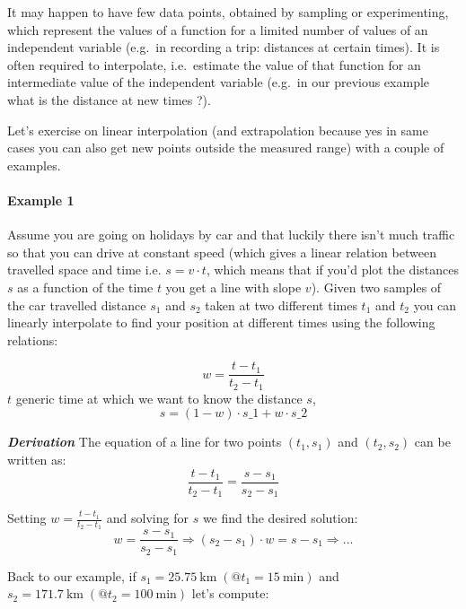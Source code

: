 \documentclass[11pt]{article}
\begin{document}
It may happen to have few data points, obtained by sampling or
experimenting, which represent the values of a function for a limited
number of values of an independent variable (e.g.~in recording a trip:
distances at certain times). It is often required to interpolate,
i.e.~estimate the value of that function for an intermediate value of
the independent variable (e.g.~in our previous example what is the
distance at new times ?).

Let's exercise on linear interpolation (and extrapolation because yes in
same cases you can also get new points outside the measured range) with
a couple of examples.

\hypertarget{example-1}{%
\paragraph{Example 1}\label{example-1}}

Assume you are going on holidays by car and that luckily there isn't
much traffic so that you can drive at constant speed (which gives a
linear relation between travelled space and time i.e. \(s = v \cdot t\),
which means that if you'd plot the distances \(s\) as a function of the
time \(t\) you get a line with slope \(v\)). Given two samples of the
car travelled distance \(s_1\) and \(s_2\) taken at two different times
\(t_1\) and \(t_2\) you can linearly interpolate to find your position
at different times using the following relations:

\begin{equation}
w = \frac{t - t_1}{t_2 - t_1}
\end{equation}
$t$ generic time at which we want to know the distance $s$,
\begin{equation}
s = (1 - w)\cdot s\_1 + w \cdot s\_2
\end{equation}


\textbf{\emph{Derivation}}
The equation of a line for two points
\((t_1, s_1)\) and \((t_2, s_2)\) can be written as:
\begin{equation}
\frac{t - t_1}{t_2 - t_1} = \frac{s - s_1}{s_2 - s_1}
\end{equation}

Setting $ w = \frac{t - t_1}{t_2 - t_1}$ and solving for $s$ we find
the desired solution:
\begin{equation}
  w = \frac{s - s_1}{s_2 - s_1} \Rightarrow (s_2 - s_1)\cdot w = s - s_1 \Rightarrow ...
\end{equation}

Back to our example, if
\(s_1 = 25.75~\mathrm{km}\;(@t_1 = 15~\mathrm{min})\) and
\(s_2 = 171.7~\mathrm{km}\;(@t_2 = 100~\mathrm{min})\) let's compute:
\end{document}
